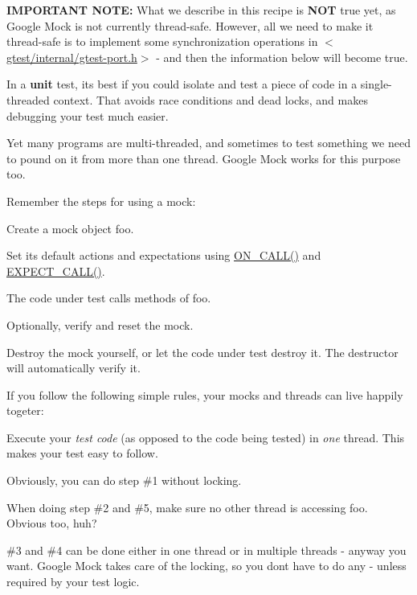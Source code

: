 {\bfseries I\+M\+P\+O\+R\+T\+A\+NT N\+O\+TE\+:} What we describe in this recipe is {\bfseries N\+OT} true yet, as Google Mock is not currently thread-\/safe. However, all we need to make it thread-\/safe is to implement some synchronization operations in {\ttfamily $<$\hyperlink{gtest-port_8h}{gtest/internal/gtest-\/port.\+h}$>$} -\/ and then the information below will become true.

In a {\bfseries unit} test, it\textquotesingle{}s best if you could isolate and test a piece of code in a single-\/threaded context. That avoids race conditions and dead locks, and makes debugging your test much easier.

Yet many programs are multi-\/threaded, and sometimes to test something we need to pound on it from more than one thread. Google Mock works for this purpose too.

Remember the steps for using a mock\+:


\begin{DoxyEnumerate}
\item Create a mock object {\ttfamily foo}.
\end{DoxyEnumerate}
\begin{DoxyEnumerate}
\item Set its default actions and expectations using {\ttfamily \hyperlink{gmock-spec-builders_8h_a5b12ae6cf84f0a544ca811b380c37334}{O\+N\+\_\+\+C\+A\+L\+L()}} and {\ttfamily \hyperlink{gmock-spec-builders_8h_a535a6156de72c1a2e25a127e38ee5232}{E\+X\+P\+E\+C\+T\+\_\+\+C\+A\+L\+L()}}.
\end{DoxyEnumerate}
\begin{DoxyEnumerate}
\item The code under test calls methods of {\ttfamily foo}.
\end{DoxyEnumerate}
\begin{DoxyEnumerate}
\item Optionally, verify and reset the mock.
\end{DoxyEnumerate}
\begin{DoxyEnumerate}
\item Destroy the mock yourself, or let the code under test destroy it. The destructor will automatically verify it.
\end{DoxyEnumerate}

If you follow the following simple rules, your mocks and threads can live happily togeter\+:


\begin{DoxyItemize}
\item Execute your {\itshape test code} (as opposed to the code being tested) in {\itshape one} thread. This makes your test easy to follow.
\item Obviously, you can do step \#1 without locking.
\item When doing step \#2 and \#5, make sure no other thread is accessing {\ttfamily foo}. Obvious too, huh?
\item \#3 and \#4 can be done either in one thread or in multiple threads -\/ anyway you want. Google Mock takes care of the locking, so you don\textquotesingle{}t have to do any -\/ unless required by your test logic.
\end{DoxyItemize}

